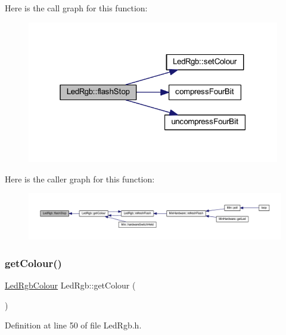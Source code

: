 Here is the call graph for this function\+:
\nopagebreak
\begin{figure}[H]
\begin{center}
\leavevmode
\includegraphics[width=313pt]{class_led_rgb_a096a0af0eb4d3c5d4c6a3f4b3aaeb9e7_cgraph}
\end{center}
\end{figure}
Here is the caller graph for this function\+:
\nopagebreak
\begin{figure}[H]
\begin{center}
\leavevmode
\includegraphics[width=350pt]{class_led_rgb_a096a0af0eb4d3c5d4c6a3f4b3aaeb9e7_icgraph}
\end{center}
\end{figure}
\mbox{\label{class_led_rgb_a542e3bf6bcf1f05df3cc442522787948}} 
\subsubsection{\texorpdfstring{get\+Colour()}{getColour()}}
{\footnotesize\ttfamily \hyperlink{class_led_rgb_af328c665510f921f0dfed643f939087b}{Led\+Rgb\+Colour} Led\+Rgb\+::get\+Colour (\begin{DoxyParamCaption}{ }\end{DoxyParamCaption})\hspace{0.3cm}{\ttfamily [inline]}}



Definition at line 50 of file Led\+Rgb.\+h.

